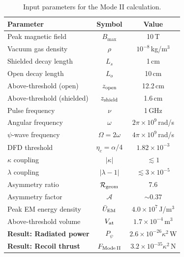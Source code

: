 \documentclass[11pt]{article}
\newcommand{\etac}{\eta_c}
\begin{document}
\begin{table}[h]
\centering
\caption{Input parameters for the Mode II calculation.}
\begin{tabular}{lcc}
\toprule
Parameter & Symbol & Value \\
\midrule
Peak magnetic field & $B_{\max}$ & 10\,T \\
Vacuum gas density & $\rho$ & $10^{-8}$\,kg/m$^3$ \\
Shielded decay length & $L_s$ & 1\,cm \\
Open decay length & $L_o$ & 10\,cm \\
Above-threshold (open) & $z_{\rm open}$ & 12.2\,cm \\
Above-threshold (shielded) & $z_{\rm shield}$ & 1.6\,cm \\
Pulse frequency & $\nu$ & 1\,GHz \\
Angular frequency & $\omega$ & $2\pi \times 10^9$\,rad/s \\
$\psi$-wave frequency & $\Omega = 2\omega$ & $4\pi \times 10^9$\,rad/s \\
DFD threshold & $\etac = \alpha/4$ & $1.82 \times 10^{-3}$ \\
$\kappa$ coupling & $|\kappa|$ & $\lesssim 1$ \\
$\lambda$ coupling & $|\lambda - 1|$ & $\lesssim 3\times10^{-5}$ \\
Asymmetry ratio & $\mathcal{R}_{\rm geom}$ & 7.6 \\
Asymmetry factor & $\mathcal{A}$ & $\sim 0.37$ \\
Peak EM energy density & $\bar{U}_{\rm EM}$ & $4.0 \times 10^7$\,J/m$^3$ \\
Above-threshold volume & $V_{\rm at}$ & $1.7 \times 10^{-4}$\,m$^3$ \\
\midrule
\textbf{Result: Radiated power} & $P_\psi$ & $2.6 \times 10^{-26}\kappa^2$\,W \\
\textbf{Result: Recoil thrust} & $F_{\rm Mode\,II}$ & $3.2 \times 10^{-35}\kappa^2$\,N \\
\bottomrule
\end{tabular}
\end{table}
\end{document}
